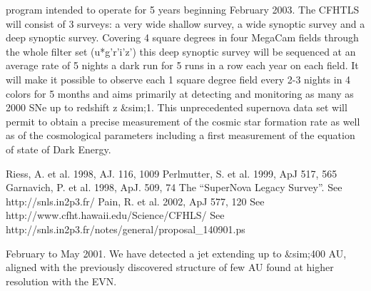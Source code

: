 {{{{{{{{{{{{{{%
program intended to operate for 5 years beginning February 2003. The
CFHTLS will consist of 3 surveys: a very wide shallow survey, a wide
synoptic survey and a deep synoptic survey.  Covering 4 square degrees
in four MegaCam fields through the whole filter set (u*g'r'i'z') this
deep synoptic survey will be sequenced at an average rate of 5 nights
a dark run for 5 runs in a row each year on each field. It will make
it possible to observe each 1 square degree field every 2-3 nights in
4 colors for 5 months and aims primarily at detecting and monitoring
as many as 2000 SNe up to redshift z &sim;1.  This unprecedented
supernova data set will permit to obtain a precise measurement of the
cosmic star formation rate as well as of the cosmological parameters
including a first measurement of the equation of state of Dark Energy.

Riess, A. et al. 1998, AJ. 116, 1009
Perlmutter, S. et al. 1999, ApJ 517, 565
Garnavich, P. et al. 1998, ApJ. 509, 74
The ``SuperNova Legacy Survey''. See  http://snls.in2p3.fr/
Pain, R. et al. 2002, ApJ 577, 120
See  http://www.cfht.hawaii.edu/Science/CFHLS/
See  http://snls.in2p3.fr/notes/general/proposal_140901.ps


February to May 2001. We have detected a jet extending up to &sim;400 AU,
aligned with the previously discovered structure of few AU found at higher
resolution with the EVN.

}}}}}}}}}}}}}}
